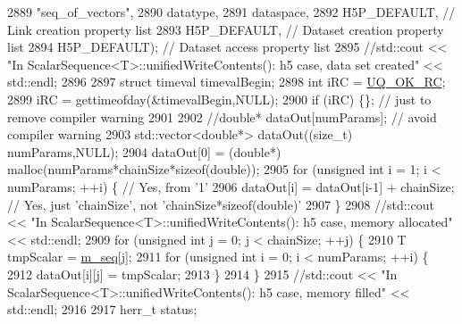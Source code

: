 \begin{DoxyCode}
2889                                          \textcolor{stringliteral}{"seq\_of\_vectors"},
2890                                          datatype,
2891                                          dataspace,
2892                                          H5P\_DEFAULT,  \textcolor{comment}{// Link creation property list}
2893                                          H5P\_DEFAULT,  \textcolor{comment}{// Dataset creation property list}
2894                                          H5P\_DEFAULT); \textcolor{comment}{// Dataset access property list }
2895               \textcolor{comment}{//std::cout << "In ScalarSequence<T>::unifiedWriteContents(): h5 case, data set created" <<
       std::endl;}
2896 
2897               \textcolor{keyword}{struct }timeval timevalBegin;
2898               \textcolor{keywordtype}{int} iRC = \hyperlink{namespace_q_u_e_s_o_a8e909502900aecf24cedba022ea84471}{UQ\_OK\_RC};
2899               iRC = gettimeofday(&timevalBegin,NULL);
2900               \textcolor{keywordflow}{if} (iRC) \{\}; \textcolor{comment}{// just to remove compiler warning}
2901 
2902               \textcolor{comment}{//double* dataOut[numParams]; // avoid compiler warning}
2903         std::vector<double*> dataOut((\textcolor{keywordtype}{size\_t}) numParams,NULL);
2904               dataOut[0] = (\textcolor{keywordtype}{double}*) malloc(numParams*chainSize*\textcolor{keyword}{sizeof}(\textcolor{keywordtype}{double}));
2905               \textcolor{keywordflow}{for} (\textcolor{keywordtype}{unsigned} \textcolor{keywordtype}{int} i = 1; i < numParams; ++i) \{ \textcolor{comment}{// Yes, from '1'}
2906                 dataOut[i] = dataOut[i-1] + chainSize; \textcolor{comment}{// Yes, just 'chainSize', not
       'chainSize*sizeof(double)'}
2907               \}
2908               \textcolor{comment}{//std::cout << "In ScalarSequence<T>::unifiedWriteContents(): h5 case, memory allocated" <<
       std::endl;}
2909               \textcolor{keywordflow}{for} (\textcolor{keywordtype}{unsigned} \textcolor{keywordtype}{int} j = 0; j < chainSize; ++j) \{
2910                 T tmpScalar = \hyperlink{class_q_u_e_s_o_1_1_scalar_sequence_ae616036fd2e62fb69df167814545e893}{m\_seq}[j];
2911                 \textcolor{keywordflow}{for} (\textcolor{keywordtype}{unsigned} \textcolor{keywordtype}{int} i = 0; i < numParams; ++i) \{
2912                   dataOut[i][j] = tmpScalar;
2913                 \}
2914               \}
2915               \textcolor{comment}{//std::cout << "In ScalarSequence<T>::unifiedWriteContents(): h5 case, memory filled" <<
       std::endl;}
2916 
2917               herr\_t status;

\end{DoxyCode}
